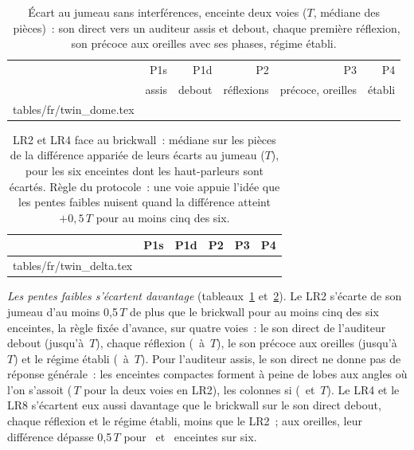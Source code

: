 \documentclass[11pt,a4paper]{article}
\makeatletter
\newcommand{\rows}[1]{\@@input tables/fr/#1.tex }
\makeatother
\begin{document}
\begin{table}[t]
\centering
\caption{Écart au jumeau sans interférences, enceinte deux voies ($T$, médiane des \nslRooms\ pièces)~:
son direct vers un auditeur assis et debout, chaque première réflexion, son précoce aux oreilles avec ses
phases, régime établi.}
\label{tab:twin}
\small
\begin{tabular}{lrrrrr}
\toprule
& P1s & P1d & P2 & P3 & P4 \\
& assis & debout & réflexions & précoce, oreilles & établi \\
\midrule
\rows{twin_dome}
\bottomrule
\end{tabular}
\end{table}

\begin{table}[t]
\centering
\caption{LR2 et LR4 face au brickwall~: médiane sur les pièces de la différence appariée de leurs écarts
au jumeau ($T$), pour les six enceintes dont les haut-parleurs sont écartés. Règle du protocole~: une voie
appuie l'idée que les pentes faibles nuisent quand la différence atteint $+0,5\,T$ pour au moins cinq des
six.}
\label{tab:twin-delta}
\small
\begin{tabular}{lrrrrr}
\toprule
& P1s & P1d & P2 & P3 & P4 \\
\midrule
\rows{twin_delta}
\bottomrule
\end{tabular}
\end{table}

\emph{Les pentes faibles s'écartent davantage} (tableaux~\ref{tab:twin} et~\ref{tab:twin-delta}). Le LR2
s'écarte de son jumeau d'au moins 0,5\,$T$ de plus que le brickwall pour au moins cinq des six enceintes,
la règle fixée d'avance, sur quatre voies~: le son direct de l'auditeur debout (jusqu'à
\nslDLrTwoFirStandingMax\,$T$), chaque réflexion (\nslDLrTwoFirReflMin\ à \nslDLrTwoFirReflMax\,$T$), le
son précoce aux oreilles (jusqu'à \nslDLrTwoFirEarsMax\,$T$) et le régime établi (\nslDLrTwoFirSteadyMin\
à \nslDLrTwoFirSteadyMax\,$T$). Pour l'auditeur assis, le son direct ne donne pas de réponse
générale~: les enceintes compactes forment à peine de lobes aux angles où l'on s'assoit
(\nslDomeLrTwoSeated\,$T$ pour la deux voies en LR2), les colonnes si (\nslTowerThreeLrTwoSeated\ et
\nslTowerFourLrTwoSeated\,$T$). Le LR4 et le LR8 s'écartent eux aussi davantage que le brickwall sur le son
direct debout, chaque réflexion et le régime établi, moins que le LR2~; aux oreilles, leur différence
dépasse 0,5\,$T$ pour \nslDLrFourFirEarsUp\ et \nslDLrEightFirEarsUp\ enceintes sur six.
\end{document}
